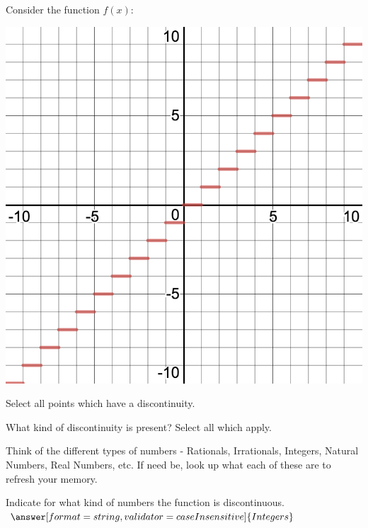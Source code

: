 \documentclass{ximera}
\begin{document}
\begin{question}
Consider the function $f(x)$:
\begin{image}
\includegraphics{continuity6}
\end{image}
Select all points which have a discontinuity.

\begin{selectAll}
\end{selectAll}

What kind of discontinuity is present? Select all which apply.

\begin{selectAll}
\end{selectAll}
\begin{question}
\begin{hint}
Think of the different types of numbers - Rationals, Irrationals, Integers, Natural Numbers, Real Numbers, etc. If need be, look up what each of these are to refresh your memory.
\end{hint}
Indicate for what kind of numbers the function is discontinuous.
$\answer[format=string,validator=caseInsensitive]{Integers}$
\end{question}

\end{question}
\end{document}
